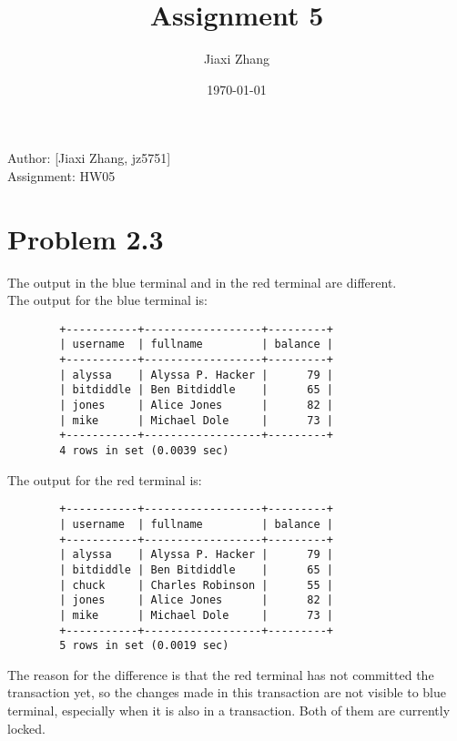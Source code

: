 \documentclass{article}
\title{Assignment 5}
\author{Jiaxi Zhang}
\date{\today}
\begin{document}
\maketitle
\begin{CJK*}{UTF8}{gbsn}
    \begin{flushleft}
    Author: [Jiaxi Zhang, jz5751]
    \\Assignment: HW05
    \end{flushleft}

    \section*{Problem 2.3} The output in the blue terminal and in the red terminal
    are different.
    \\The output for the blue terminal is:
    \begin{lstlisting}
        +-----------+------------------+---------+
        | username  | fullname         | balance |
        +-----------+------------------+---------+
        | alyssa    | Alyssa P. Hacker |      79 |
        | bitdiddle | Ben Bitdiddle    |      65 |
        | jones     | Alice Jones      |      82 |
        | mike      | Michael Dole     |      73 |
        +-----------+------------------+---------+
        4 rows in set (0.0039 sec)
    \end{lstlisting}
    The output for the red terminal is:
    \begin{lstlisting}
        +-----------+------------------+---------+
        | username  | fullname         | balance |
        +-----------+------------------+---------+
        | alyssa    | Alyssa P. Hacker |      79 |
        | bitdiddle | Ben Bitdiddle    |      65 |
        | chuck     | Charles Robinson |      55 |
        | jones     | Alice Jones      |      82 |
        | mike      | Michael Dole     |      73 |
        +-----------+------------------+---------+
        5 rows in set (0.0019 sec)
    \end{lstlisting}
    The reason for the difference is that the red terminal has not committed the
    transaction yet, so the changes made in this transaction are not visible to
    blue terminal, especially when it is also in a transaction. Both of them are
    currently locked.

\end{CJK*}
\end{document}
